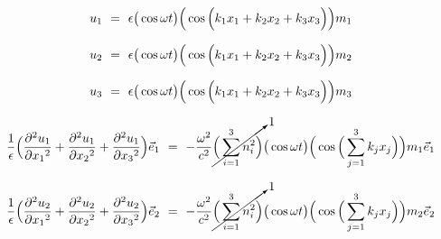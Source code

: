 \documentclass{article}
\begin{document}
\begin{equation} \label{eq:1}
u_1 \hspace{0.125cm} = \hspace{0.125cm} \epsilon \big( \cos{ \omega t } \big) \Big( \cos \Big( k_1 x_1 + k_2 x_2 + k_3 x_3 \Big) \Big) m_1 \hspace{0.125cm} 
\end{equation}

\begin{equation} \label{eq:1}
u_2 \hspace{0.125cm} = \hspace{0.125cm} \epsilon \big( \cos{ \omega t } \big) \Big( \cos \Big( k_1 x_1 + k_2 x_2 + k_3 x_3 \Big) \Big) m_2 \hspace{0.125cm} 
\end{equation}

\begin{equation} \label{eq:1}
u_3 \hspace{0.125cm} = \hspace{0.125cm} \epsilon \big( \cos{ \omega t } \big) \Big( \cos \Big( k_1 x_1 + k_2 x_2 + k_3 x_3 \Big) \Big) m_3 \hspace{0.125cm} 
\end{equation}

\begin{equation} \label{eq:1}
\frac{1}{\epsilon} \Big( \frac{\partial{}^2 u_1}{\partial{x_1}^2} + \frac{\partial{}^2 u_1}{\partial{x_2}^2} + \frac{\partial{}^2 u_1}{\partial{x_3}^2} \Big) \vec{e}_1 \hspace{0.125cm} = \hspace{0.125cm} - \frac{\omega{}^2}{c^2} \cancelto{1}{\Big( \sum_{i = 1}^{3} n_{i}^{2} \Big)} \big( \cos{ \omega t } \big) \Big( \cos \Big( \sum_{j = 1}^{3} k_j x_j \Big) \Big) m_1 \vec{e}_1 \hspace{0.125cm} 
\end{equation}

\begin{equation} \label{eq:1}
\frac{1}{\epsilon}  \Big( \frac{\partial{}^2 u_2}{\partial{x_1}^2} + \frac{\partial{}^2 u_2}{\partial{x_2}^2} + \frac{\partial{}^2 u_2}{\partial{x_3}^2} \Big) \vec{e}_2 \hspace{0.125cm} = \hspace{0.125cm} - \frac{\omega{}^2}{c^2} \cancelto{1}{\Big( \sum_{i = 1}^{3} n_{i}^{2} \Big)} \big( \cos{ \omega t } \big) \Big( \cos \Big( \sum_{j = 1}^{3} k_j x_j \Big) \Big) m_2 \vec{e}_2 \hspace{0.125cm} 
\end{equation}
\end{document}
